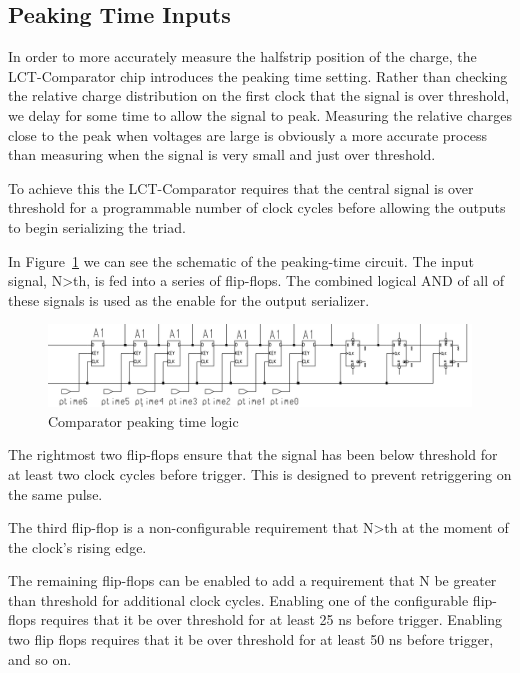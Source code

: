 \documentclass[letterpaper]{article}
\begin{document}
\subsection{Peaking Time Inputs}\label{sec:pktime}

In order to more accurately measure the halfstrip position of the charge, the LCT-Comparator chip introduces the peaking time setting. Rather than checking the relative charge distribution on the first clock that the signal is over threshold, we delay for some time to allow the signal to peak.  Measuring the relative charges close to the peak when voltages are large is obviously a more accurate process than measuring when the signal is very small and just over threshold.

To achieve this the LCT-Comparator requires that the central signal is over threshold for a programmable number of clock cycles before allowing the outputs to begin serializing the triad.

In Figure~\ref{img:peaking-time} we can see the schematic of the peaking-time circuit. The input signal, N>th, is fed into a series of flip-flops. The combined logical AND of all of these signals is used as the enable for the output serializer.

\begin{figure}[H]
\centering \includegraphics[keepaspectratio=true, width=0.9 \textwidth]{Images/peaking-time.png}
\caption{Comparator peaking time logic}
\label{img:peaking-time}
\end{figure}

The rightmost two flip-flops ensure that the signal has been below threshold for at least two clock cycles before trigger. This is designed to prevent retriggering on the same pulse.

The third flip-flop is a non-configurable requirement that N>th at the moment of the clock's rising edge.

The remaining flip-flops can be enabled to add a requirement that N be greater than threshold for additional clock cycles. Enabling one of the configurable flip-flops requires that it be over threshold for at least 25 ns before trigger. Enabling two flip flops requires that it be over threshold for at least 50 ns before trigger, and so on.
\end{document}
